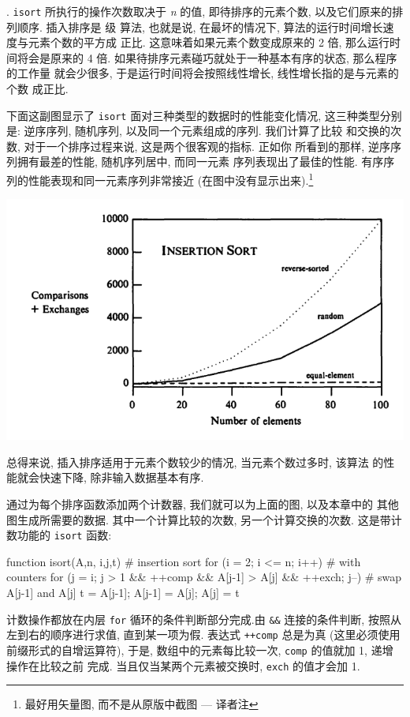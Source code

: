 . \texttt{isort} 所执行的操作次数取决于 \textit{n} 的值,
即待排序的元素个数, 以及它们原来的排列顺序. 插入排序是  级
算法, 也就是说, 在最坏的情况下, 算法的运行时间增长速度与元素个数的平方成
正比. 这意味着如果元素个数变成原来的 2 倍, 那么运行时间将会是原来的
4 倍. 如果待排序元素碰巧就处于一种基本有序的状态, 那么程序的工作量
就会少很多, 于是运行时间将会按照线性增长, 线性增长指的是与元素的个数
成正比.

下面这副图显示了 \texttt{isort} 面对三种类型的数据时的性能变化情况, 
这三种类型分别是: 逆序序列, 随机序列, 以及同一个元素组成的序列. 
我们计算了比较
和交换的次数, 对于一个排序过程来说, 这是两个很客观的指标. 正如你
所看到的那样, 逆序序列拥有最差的性能, 随机序列居中, 而同一元素
序列表现出了最佳的性能. 有序序列的性能表现和同一元素序列非常接近
(在图中没有显示出来).\footnote{最好用矢量图, 而不是从原版中截图 --- 
译者注}

\begin{center}
    \includegraphics[scale=0.7]{./images/insertion_sort.png}
\end{center}

总得来说, 插入排序适用于元素个数较少的情况, 当元素个数过多时, 该算法
的性能就会快速下降, 除非输入数据基本有序.

通过为每个排序函数添加两个计数器, 我们就可以为上面的图, 以及本章中的
其他图生成所需要的数据. 其中一个计算比较的次数, 另一个计算交换的次数.
这是带计数功能的 \texttt{isort} 函数:
\begin{awkcode}
    function isort(A,n,     i,j,t) {  # insertion sort
        for (i = 2; i <= n; i++)      # with counters
            for (j = i; j > 1 && ++comp &&
              A[j-1] > A[j] && ++exch; j--) {
                # swap A[j-1] and A[j]
                t = A[j-1]; A[j-1] = A[j]; A[j] = t
            }
    }
\end{awkcode}
计数操作都放在内层 \texttt{for} 循环的条件判断部分完成.由 \verb'&&' 
连接的条件判断, 按照从左到右的顺序进行求值, 直到某一项为假. 表达式
\texttt{++comp} 总是为真 (这里必须使用前缀形式的自增运算符), 于是,
数组中的元素每比较一次, \texttt{comp} 的值就加 1, 递增操作在比较之前
完成. 当且仅当某两个元素被交换时, \texttt{exch} 的值才会加 1.

